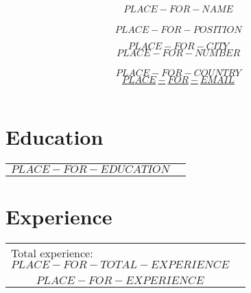 \documentclass[12pt]{article}
\begin{document}
    \begin{center}
        \Huge\textbf{$$PLACE-FOR-NAME$$} \\
        \large\textbf{$$PLACE-FOR-POSITION$$}
    \end{center}
    $$PLACE-FOR-CITY$$ \hfill $$PLACE-FOR-NUMBER$$\\
    $$PLACE-FOR-COUNTRY$$ \hfill \href{mailto:$$PLACE-FOR-EMAIL$$}{$$PLACE-FOR-EMAIL$$} \\


    \section{Education}\label{sec:education}
    \begin{tabular}{ l p{15in} }
        $$PLACE-FOR-EDUCATION$$

    \end{tabular}


    \section{Experience}\label{sec:experience}
    \begin{tabular}{ l p{15in} }
        Total experience: $$PLACE-FOR-TOTAL-EXPERIENCE$$ \\
        \\
        $$PLACE-FOR-EXPERIENCE$$

    \end{tabular}
\end{document}
